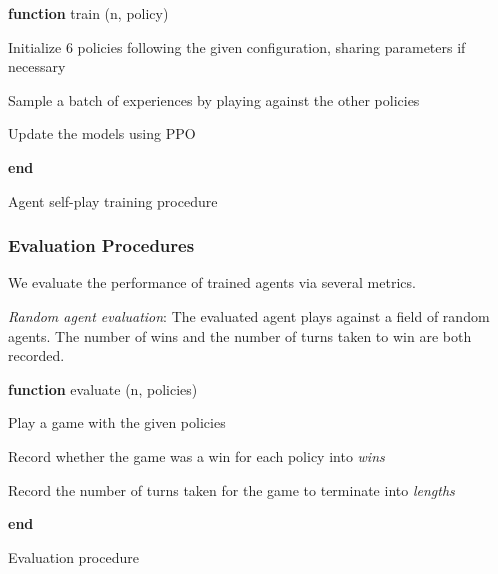 \documentclass[12pt, a4paper, twocolumn]{article}
\begin{document}
\begin{algorithm}

  \textbf{function} train (n, policy)

  \Indp
  
  
  Initialize 6 policies following the given configuration, sharing parameters if necessary

   {
    Sample a batch of experiences by playing against the other policies

    Update the models using PPO
  }

  \Indm
  \textbf{end}
  \caption{Agent self-play training procedure}
\end{algorithm}


\subsubsection{Evaluation Procedures}

We evaluate the performance of trained agents via several metrics.

\textit{Random agent evaluation}: The evaluated agent plays against a field of random agents. The number of wins and the number of turns taken to win are both recorded.

\begin{algorithm}

  \textbf{function} evaluate (n, policies)

  \Indp
  

   {
    Play a game with the given policies

    Record whether the game was a win for each policy into \textit{wins}

    Record the number of turns taken for the game to terminate into \textit{lengths}
  }


  \Indm

  \textbf{end}

  
  \caption{Evaluation procedure}
\end{algorithm}
\end{document}
